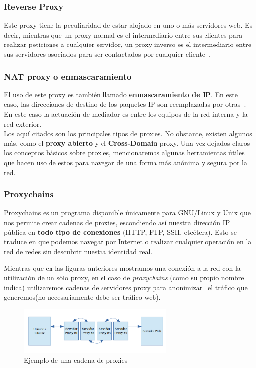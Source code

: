 \subsubsection{Reverse Proxy}

Este proxy tiene la peculiaridad de estar alojado en uno o más servidores web.
Es decir, mientras que un proxy normal es el intermediario entre sus clientes para realizar peticiones a cualquier servidor, un proxy inverso es el intermediario entre sus servidores asociados para ser contactados por cualquier cliente~\cite{article:proxy_rev}.

\subsubsection{NAT proxy o enmascaramiento}

El uso de este proxy es también llamado \textbf{enmascaramiento de IP}. En este caso, las direcciones de destino de los paquetes IP son reemplazadas por otras~\cite{article:nat}.
En este caso la actuación de mediador es entre los equipos de la red interna y la red exterior.\\

Los aquí citados son los principales tipos de proxies. No obstante, existen algunos más, como el \textbf{proxy abierto} y el \textbf{Cross-Domain }proxy.
Una vez dejados claros los conceptos básicos sobre proxies, mencionaremos algunas herramientas útiles que hacen uso de estos para navegar de una forma más anónima y segura por la red.

\subsubsection{Proxychains}

Proxychains es un programa disponible únicamente para GNU/Linux y Unix que nos permite crear cadenas de proxies, escondiendo así nuestra dirección IP pública en \textbf{todo tipo de conexiones} (HTTP, FTP, SSH, etcétera). 
Esto se traduce en que podemos navegar por Internet o realizar cualquier operación en la red de redes sin descubrir nuestra identidad real.

Mientras que en las figuras anteriores mostramos una conexión a la red con la utilización de un sólo proxy, en el caso de \textit{proxychains} (como su propio nombre indica) utilizaremos cadenas de servidores proxy para anonimizar~\cite{article:proxychains} el tráfico que generemos(no necesariamente debe ser tráfico web).

\begin{figure}[h]
	\centerline{
		\mbox{\includegraphics[width=3.00in]{images/proxy_chain.png}}
	}
	\caption{Ejemplo de una cadena de proxies}
	\label{fig:proxy_chain}
\end{figure}


